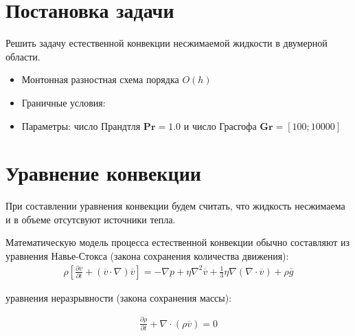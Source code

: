 \documentclass[a4paper, 12pt]{article}
\newcommand{\Pra}{\mathbf{Pr}}
\newcommand{\Gra}{\mathbf{Gr}}
\begin{document}
  \section{Постановка задачи}
    Решить задачу естественной конвекции несжимаемой жидкости в двумерной
    области.
    \begin{itemize}
      \item Монтонная разностная схема порядка $O(h)$
      \item Граничные условия:
        \begin{center}
        \end{center}
      \item Параметры: число Прандтля $\Pra=1.0$ и число Грасгофа
        $\Gra=[100;10000]$
    \end{itemize}

  \pagebreak

  \section{Уравнение конвекции}
    При составлении уравнения конвекции будем считать, что жидкость несжимаема и
    в объеме отсутсвуют источники тепла.

    Математическую модель процесса естественной конвекции обычно составляют из
    уравнения Навье-Стокса (закона сохранения количества движения):
    \begin{equation}
    \begin{gathered}
    \label{f1}
    \rho[\frac{\partial \overline v}{\partial t} + (\overline v \cdot \nabla)\overline v]=-\nabla p + \eta \nabla^2 \overline v + \frac{1}{3} \eta \nabla (\nabla \cdot \overline v) + \rho \overline g
    \end{gathered}
    \end{equation}

    уравнения неразрывности (закона сохранения массы):

    \begin{equation}
    \begin{gathered}
    \label{f2}
    \frac{\partial \rho}{\partial t} + \nabla \cdot (\rho \overline v) = 0
    \end{gathered}
    \end{equation}
\end{document}
